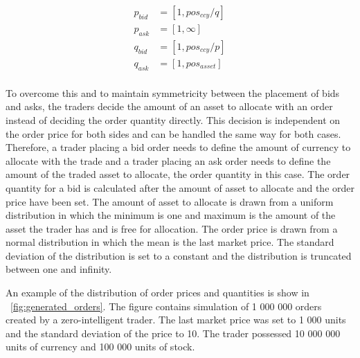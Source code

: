 \begin{equation}
\begin{aligned}
p_{bid} &= \left[1, pos_{ccy} / q \right] \\
p_{ask} &= \left[1, \infty \right] \\
q_{bid} &= \left[1, pos_{ccy} / p\right] \\
q_{ask} &= \left[1, pos_{asset}\right] \\
\end{aligned}
\label{eq:feasible_ranges}
\end{equation}

To overcome this and to maintain symmetricity between the placement of bids and asks, 
the traders decide the amount of an asset to allocate with an order instead of deciding 
the order quantity directly. This decision is independent on the order price for both
sides and can be handled the same way for both cases. Therefore, a trader placing a bid order 
needs to define the amount of currency to allocate with the trade and a trader placing an ask
order needs to define the amount of the traded asset to allocate, the order quantity in this case. 
The order quantity for a bid is calculated after the amount of asset to allocate 
and the order price have been set. The amount of asset to allocate is drawn from a uniform
distribution in which the minimum is one and maximum is the amount of the asset the trader
has and is free for allocation. The order price is drawn from a normal distribution in which 
the mean is the last market price. The standard deviation of the distribution is set to a 
constant and the distribution is truncated between one and infinity.


An example of the distribution of order prices and quantities
is show in ~\ref{fig:generated_orders}. The figure contains simulation
of 1 000 000 orders created by a zero-intelligent trader. 
The last market price was set to 1 000 units and the standard deviation of the price to 10. 
The trader possessed 10 000 000 units of currency and 100 000 
units of stock.


